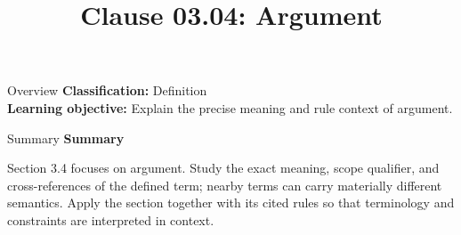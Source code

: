 \documentclass[10pt,letterpaper]{article}
\title{Clause 03.04: Argument}
\author{}
\date{}
\begin{document}
\maketitle
\begin{CornellOverviewBox}{Overview}
\textbf{Classification:} Definition\\[2pt]
\textbf{Learning objective:} Explain the precise meaning and rule context of argument.
\end{CornellOverviewBox}\begin{CornellSummaryBox}{Summary}
{\sffamily\bfseries\color{Accent} Summary}\par\vspace{3pt}Section 3.4 focuses on argument. Study the exact meaning, scope qualifier, and cross-references of the defined term; nearby terms can carry materially different semantics. Apply the section together with its cited rules so that terminology and constraints are interpreted in context.
\end{CornellSummaryBox}
\end{document}
